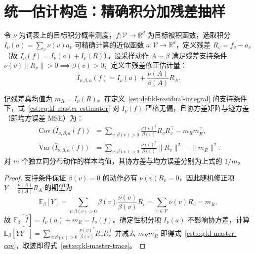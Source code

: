\documentclass[lang=cn,scheme=chinese,openany]{elegantbook}
\newcommand{\E}{\mathbb E}
\newcommand{\Var}{\operatorname{Var}}
\begin{document}
\section{统一估计构造：精确积分加残差抽样}
\label{est:sec:kl-residual-framework}

\begin{definition}[可精确积分的近似代理函数与残差修正估计量]
\label{est:def:kl-residual-integral}
令 $\nu$ 为词表上的目标积分概率测度，$f:\mathcal V\to\mathbb R^d$ 为目标被积函数，选取积分 $I_\nu(a)=\sum_v\nu(v)a_v$ 可精确计算的近似函数 $a:\mathcal V\to\mathbb R^d$，定义残差 $R_v=f_v-a_v$（故 $I_\nu(f)=I_\nu(a)+I_\nu(R)$）。设采样动作 $A\sim\beta$ 满足残差支持条件 $\nu(v)\|R_v\|>0\implies\beta(v)>0$，定义主残差修正估计量：
\begin{equation}
 \widehat I_{\nu,\beta,a}(f)
 =I_\nu(a)+\frac{\nu(A)}{\beta(A)}R_A.
 \label{est:eq:kl-master-estimator}
\end{equation}
\end{definition}

\begin{theorem}
\label{est:thm:kl-master-moments}
记残差真均值为 $m_R=I_\nu(R)$。在定义~\ref{est:def:kl-residual-integral} 的支持条件下，式~\eqref{est:eq:kl-master-estimator} 对 $I_\nu(f)$ 严格无偏，且协方差矩阵与迹方差（即均方误差 MSE）为：
\begin{align}
 \operatorname{Cov}\bigl(\widehat I_{\nu,\beta,a}(f)\bigr)
 &=\sum_{v:\beta(v)>0}\frac{\nu(v)^2}{\beta(v)}R_v R_v^\top-m_R m_R^\top,
 \label{est:eq:kl-master-cov}\\
 \Var\bigl(\widehat I_{\nu,\beta,a}(f)\bigr)
 &=\sum_{v:\beta(v)>0}\frac{\nu(v)^2}{\beta(v)}\lVert R_v\rVert^2-\lVert m_R\rVert^2.
 \label{est:eq:kl-master-trace}
\end{align}
对 $m$ 个独立同分布动作的样本均值，其协方差与均方误差分别为上式的 $1/m$。
\end{theorem}
\begin{proof}
支持条件保证 $\beta(v)=0$ 的动作必有 $\nu(v)R_v=0$，因此随机修正项 $Y=\frac{\nu(A)}{\beta(A)}R_A$ 的期望为
\begin{equation*}
 \E_\beta[Y]=\sum_{v:\beta(v)>0}\beta(v)\frac{\nu(v)}{\beta(v)}R_v=\sum_{v\in\mathcal V}\nu(v)R_v=m_R,
\end{equation*}
故 $\E_\beta[\widehat I]=I_\nu(a)+m_R=I_\nu(f)$。确定性积分项 $I_\nu(a)$ 不影响协方差，计算 $\E_\beta[YY^\top]=\sum_{v:\beta(v)>0}\frac{\nu(v)^2}{\beta(v)}R_v R_v^\top$ 并减去 $m_R m_R^\top$ 即得式~\eqref{est:eq:kl-master-cov}，取迹即得式~\eqref{est:eq:kl-master-trace}。
\end{proof}
\end{document}
